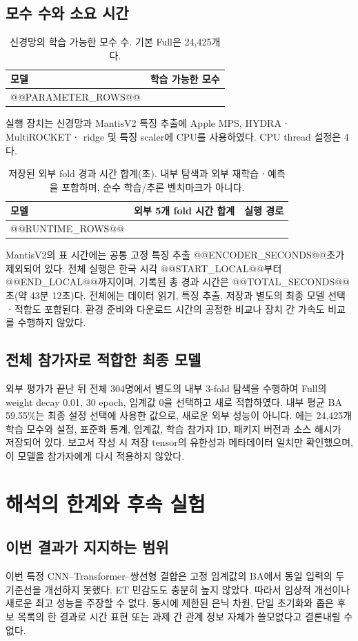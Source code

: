 \documentclass[11pt,a4paper]{article}
\newcommand{\code}[1]{\texttt{\detokenize{#1}}}
\numberwithin{equation}{section}
\begin{document}
\subsection{모수 수와 소요 시간}
\begin{table}[H]\centering\small
\caption{신경망의 학습 가능한 모수 수. 기본 Full은 24,425개다.}
\begin{tabular}{@{}lr@{}}\toprule 모델 & 학습 가능한 모수\\\midrule
@@PARAMETER_ROWS@@
\bottomrule\end{tabular}
\end{table}
실행 장치는 신경망과 MantisV2 특징 추출에 Apple MPS, HYDRAㆍMultiROCKETㆍ
ridge 및 특징 scaler에 CPU를 사용하였다. CPU thread 설정은 4다.
\begin{table}[H]\centering\small
\caption{저장된 외부 fold 경과 시간 합계(초). 내부 탐색과 외부 재학습ㆍ예측을
포함하며, 순수 학습/추론 벤치마크가 아니다.}
\begin{tabular}{@{}lrl@{}}\toprule 모델 & 외부 5개 fold 시간 합계 & 실행 경로\\\midrule
@@RUNTIME_ROWS@@
\bottomrule\end{tabular}\label{tab:runtime}
\end{table}
MantisV2의 표 시간에는 공통 고정 특징 추출 @@ENCODER_SECONDS@@초가 제외되어 있다.
전체 실행은 한국 시각 @@START_LOCAL@@부터 @@END_LOCAL@@까지이며,
기록된 총 경과 시간은 @@TOTAL_SECONDS@@초(약 43분 12초)다.
전체에는 데이터 읽기, 특징 추출, 저장과 별도의 최종 모델 선택ㆍ적합도 포함된다.
환경 준비와 다운로드 시간의 공정한 비교나 장치 간 가속도 비교를 수행하지 않았다.

\subsection{전체 참가자로 적합한 최종 모델}
외부 평가가 끝난 뒤 전체 304명에서 별도의 내부 3-fold 탐색을 수행하여
Full의 weight decay 0.01, 30 epoch, 임계값 0을 선택하고 새로 적합하였다.
내부 평균 BA 59.55\%는 최종 설정 선택에 사용한 값으로, 새로운 외부 성능이 아니다.
\code{final_model.pt}에는 24,425개 학습 모수와 설정, 표준화 통계, 임계값,
학습 참가자 ID, 패키지 버전과 소스 해시가 저장되어 있다.
보고서 작성 시 저장 tensor의 유한성과 메타데이터 일치만 확인했으며,
이 모델을 참가자에게 다시 적용하지 않았다.

\section{해석의 한계와 후속 실험}
\subsection{이번 결과가 지지하는 범위}
이번 특정 CNN--Transformer--쌍선형 결합은 고정 임계값의 BA에서
동일 입력의 두 기준선을 개선하지 못했다. ET 민감도도 충분히 높지 않았다.
따라서 임상적 개선이나 새로운 최고 성능을 주장할 수 없다.
동시에 제한된 은닉 차원, 단일 초기화와 좁은 후보 목록의 한 결과로
시간 표현 또는 과제 간 관계 정보 자체가 쓸모없다고 결론내릴 수 없다.
\end{document}
